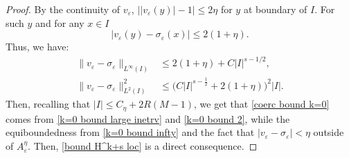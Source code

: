 \documentclass{article}
\theoremstyle{definition}
\newcommand{\e}{\varepsilon}
\def\e{\varepsilon}
\begin{document}
\begin{proof}
    By the continuity of $v_\e$,  $\left||v_\e(y)| - 1\right|\leq 2\eta$ for $y$ at boundary of $I$. For such $y$ and for any $x\in I$
    \[
        |v_\e(y)-\sigma_\e(x)| \leq 2(1+\eta).
    \]
    Thus, we have:
    \begin{align}
        \label{k=0 bound infty}\|v_\e-\sigma_\e\|_{L^\infty(I)}&\leq 2(1+\eta)+C|I|^{s-1/2},\\
        \label{k=0 bound 2}\|v_\e-\sigma_\e\|^2_{L^2(I)} &\leq \big(C|I|^{s-\frac{1}{2}}+ 2(1+\eta)\big)^2|I|.
    \end{align}
    Then, recalling that $|I|\leq C_\eta + 2R(M-1)$, we get that \eqref{coerc bound k=0} comes from \eqref{k=0 bound large inetrv} and \eqref{k=0 bound 2}, while the equiboundedness from \eqref{k=0 bound infty} and the fact that $|v_\e-\sigma_\e|<\eta$ outside of $A^\eta_\e$. 
    Then, \eqref{bound H^k+s loc} is a direct consequence.
\end{proof}
\end{document}
